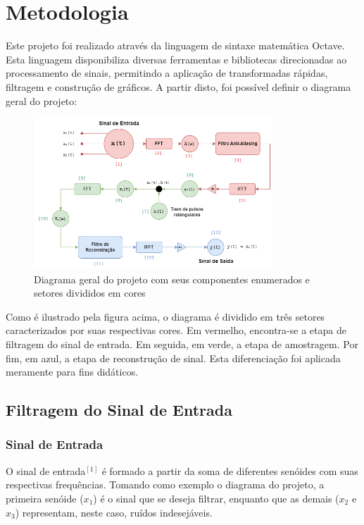 \documentclass[journal]{IEEEtran}
\begin{document}
\section{Metodologia}

Este projeto foi realizado através da linguagem de sintaxe matemática Octave. Esta linguagem disponibiliza diversas ferramentas e bibliotecas direcionadas ao processamento de sinais, permitindo a aplicação de transformadas rápidas, filtragem e construção de gráficos. A partir disto, foi possível definir o diagrama geral do projeto:

\begin{figure}[H]
\captionsetup{justification=centering}
\centering %
\includegraphics[width=9cm]{Diagrama_Geral.png} %
\caption{Diagrama geral do projeto com seus componentes enumerados e setores divididos em cores}
\end{figure}

Como é ilustrado pela figura acima, o diagrama é dividido em três setores caracterizados por suas respectivas cores. Em vermelho, encontra-se a etapa de filtragem do sinal de entrada. Em seguida, em verde, a etapa de amostragem. Por fim, em azul, a etapa de reconstrução de sinal. Esta diferenciação foi aplicada meramente para fins didáticos. 

\subsection{Filtragem do Sinal de Entrada}

\subsubsection{Sinal de Entrada}

O sinal de entrada$^{[1]}$ é formado a partir da soma de diferentes senóides com suas respectivas frequências. Tomando como exemplo o diagrama do projeto, a primeira senóide ($x_1$) é o sinal que se deseja filtrar, enquanto que as demais ($x_2$ e $x_3$) representam, neste caso, ruídos indesejáveis. 
\end{document}
